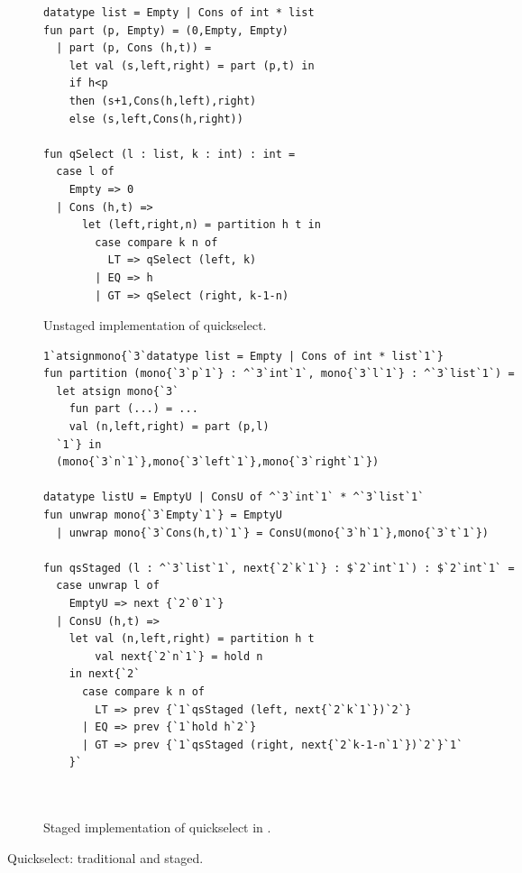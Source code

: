 
\begin{figure*}
\begin{subfigure}{0.5\textwidth}
\begin{lstlisting} 
datatype list = Empty | Cons of int * list
fun part (p, Empty) = (0,Empty, Empty) 
  | part (p, Cons (h,t)) = 
    let val (s,left,right) = part (p,t) in 
    if h<p 
    then (s+1,Cons(h,left),right) 
    else (s,left,Cons(h,right))

fun qSelect (l : list, k : int) : int = 
  case l of
    Empty => 0
  | Cons (h,t) => 
      let (left,right,n) = partition h t in
        case compare k n of
          LT => qSelect (left, k)
        | EQ => h
        | GT => qSelect (right, k-1-n)
\end{lstlisting}
\caption{Unstaged implementation of quickselect.}
\label{fig:qs-unstaged}
\end{subfigure}%
\begin{subfigure}{0.5\textwidth}
\begin{lstlisting} 
1`atsignmono{`3`datatype list = Empty | Cons of int * list`1`}
fun partition (mono{`3`p`1`} : ^`3`int`1`, mono{`3`l`1`} : ^`3`list`1`) =
  let atsign mono{`3` 
    fun part (...) = ...
    val (n,left,right) = part (p,l)
  `1`} in
  (mono{`3`n`1`},mono{`3`left`1`},mono{`3`right`1`})

datatype listU = EmptyU | ConsU of ^`3`int`1` * ^`3`list`1`
fun unwrap mono{`3`Empty`1`} = EmptyU
  | unwrap mono{`3`Cons(h,t)`1`} = ConsU(mono{`3`h`1`},mono{`3`t`1`})

fun qsStaged (l : ^`3`list`1`, next{`2`k`1`} : $`2`int`1`) : $`2`int`1` = 
  case unwrap l of
    EmptyU => next {`2`0`1`}
  | ConsU (h,t) => 
    let val (n,left,right) = partition h t
        val next{`2`n`1`} = hold n 
    in next{`2`
      case compare k n of
        LT => prev {`1`qsStaged (left, next{`2`k`1`})`2`}
      | EQ => prev {`1`hold h`2`}
      | GT => prev {`1`qsStaged (right, next{`2`k-1-n`1`})`2`}`1`
    }`



\end{lstlisting}
\caption{Staged implementation of quickselect in \lang.}
\vspace{4.8em}
\label{fig:qs-staged}
\end{subfigure}
\caption{Quickselect: traditional and staged.}
\end{figure*}


